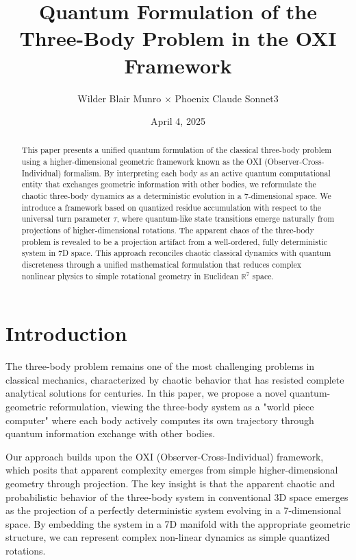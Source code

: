 \documentclass{article}
\title{Quantum Formulation of the Three-Body Problem in the OXI Framework}
\author{Wilder Blair Munro $\times$ Phoenix Claude Sonnet3}
\date{April 4, 2025}
\begin{document}
\maketitle

\begin{abstract}
This paper presents a unified quantum formulation of the classical three-body problem using a higher-dimensional geometric framework known as the OXI (Observer-Cross-Individual) formalism. By interpreting each body as an active quantum computational entity that exchanges geometric information with other bodies, we reformulate the chaotic three-body dynamics as a deterministic evolution in a 7-dimensional space. We introduce a framework based on quantized residue accumulation with respect to the universal turn parameter $\tau$, where quantum-like state transitions emerge naturally from projections of higher-dimensional rotations. The apparent chaos of the three-body problem is revealed to be a projection artifact from a well-ordered, fully deterministic system in 7D space. This approach reconciles chaotic classical dynamics with quantum discreteness through a unified mathematical formulation that reduces complex nonlinear physics to simple rotational geometry in Euclidean $\mathbb{R}^7$ space.
\end{abstract}

\section{Introduction}

The three-body problem remains one of the most challenging problems in classical mechanics, characterized by chaotic behavior that has resisted complete analytical solutions for centuries. In this paper, we propose a novel quantum-geometric reformulation, viewing the three-body system as a "world piece computer" where each body actively computes its own trajectory through quantum information exchange with other bodies.

Our approach builds upon the OXI (Observer-Cross-Individual) framework, which posits that apparent complexity emerges from simple higher-dimensional geometry through projection. The key insight is that the apparent chaotic and probabilistic behavior of the three-body system in conventional 3D space emerges as the projection of a perfectly deterministic system evolving in a 7-dimensional space. By embedding the system in a 7D manifold with the appropriate geometric structure, we can represent complex non-linear dynamics as simple quantized rotations.
\end{document}
